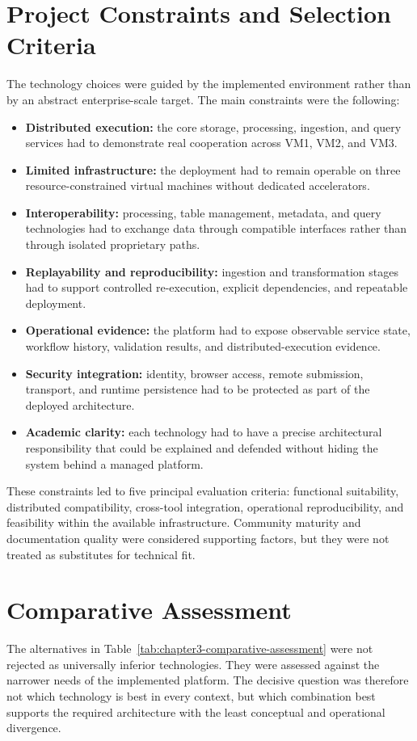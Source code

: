 \section{Project Constraints and Selection Criteria}
The technology choices were guided by the implemented environment rather than by an abstract enterprise-scale target. The main constraints were the following:
\begin{itemize}
    \item \textbf{Distributed execution:} the core storage, processing, ingestion, and query services had to demonstrate real cooperation across VM1, VM2, and VM3.
    \item \textbf{Limited infrastructure:} the deployment had to remain operable on three resource-constrained virtual machines without dedicated accelerators.
    \item \textbf{Interoperability:} processing, table management, metadata, and query technologies had to exchange data through compatible interfaces rather than through isolated proprietary paths.
    \item \textbf{Replayability and reproducibility:} ingestion and transformation stages had to support controlled re-execution, explicit dependencies, and repeatable deployment.
    \item \textbf{Operational evidence:} the platform had to expose observable service state, workflow history, validation results, and distributed-execution evidence.
    \item \textbf{Security integration:} identity, browser access, remote submission, transport, and runtime persistence had to be protected as part of the deployed architecture.
    \item \textbf{Academic clarity:} each technology had to have a precise architectural responsibility that could be explained and defended without hiding the system behind a managed platform.
\end{itemize}

These constraints led to five principal evaluation criteria: functional suitability, distributed compatibility, cross-tool integration, operational reproducibility, and feasibility within the available infrastructure. Community maturity and documentation quality were considered supporting factors, but they were not treated as substitutes for technical fit.

\section{Comparative Assessment}
The alternatives in Table~\ref{tab:chapter3-comparative-assessment} were not rejected as universally inferior technologies. They were assessed against the narrower needs of the implemented \projectname{} platform. The decisive question was therefore not which technology is best in every context, but which combination best supports the required architecture with the least conceptual and operational divergence.

